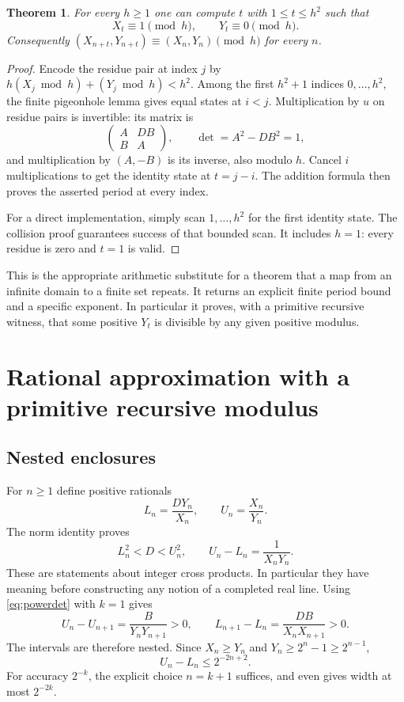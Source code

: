 \documentclass[11pt,letterpaper]{article}
\newtheorem{theorem}{Theorem}[section]
\theoremstyle{definition}
\begin{document}
\begin{theorem}\label{thm:modular}
For every $h\ge1$ one can compute $t$ with $1\le t\le h^2$ such that
\[
 X_t\equiv1\pmod h,\qquad Y_t\equiv0\pmod h.
\]
Consequently $(X_{n+t},Y_{n+t})\equiv(X_n,Y_n)\pmod h$ for every $n$.
\end{theorem}
\begin{proof}
Encode the residue pair at index $j$ by
$h(X_j\bmod h)+(Y_j\bmod h)<h^2$.
Among the first $h^2+1$ indices $0,\ldots,h^2$, the finite pigeonhole
lemma gives equal states at $i<j$. Multiplication by $u$ on residue pairs
is invertible: its matrix is
\[
 \begin{pmatrix}A&DB\\B&A\end{pmatrix},\qquad
 \det=A^2-DB^2=1,
\]
and multiplication by $(A,-B)$ is its inverse, also modulo $h$.
Cancel $i$ multiplications to get the identity state at $t=j-i$.
The addition formula then proves the asserted period at every index.

For a direct implementation, simply scan $1,\ldots,h^2$ for the first
identity state. The collision proof guarantees success of that bounded
scan. It includes $h=1$: every residue is zero and $t=1$ is valid.
\end{proof}

This is the appropriate arithmetic substitute for a theorem that a map from
an infinite domain to a finite set repeats. It returns an explicit finite
period bound and a specific exponent. In particular it proves, with a
primitive recursive witness, that some positive $Y_t$ is divisible by any
given positive modulus.

\section{Rational approximation with a primitive recursive modulus}\label{sec:approximation}

\subsection{Nested enclosures}

For $n\ge1$ define positive rationals
\[
 L_n=\frac{DY_n}{X_n},\qquad U_n=\frac{X_n}{Y_n}.
\]
The norm identity proves
\begin{equation}\label{eq:enclosure}
 L_n^2<D<U_n^2,\qquad U_n-L_n=\frac1{X_nY_n}.
\end{equation}
These are statements about integer cross products. In particular they have
meaning before constructing any notion of a completed real line.
Using \eqref{eq:powerdet} with $k=1$ gives
\begin{equation}\label{eq:nesting}
 U_n-U_{n+1}=\frac B{Y_nY_{n+1}}>0,\qquad
 L_{n+1}-L_n=\frac{DB}{X_nX_{n+1}}>0.
\end{equation}
The intervals are therefore nested. Since $X_n\ge Y_n$ and
$Y_n\ge2^n-1\ge2^{n-1}$,
\begin{equation}\label{eq:modulus}
 U_n-L_n\le2^{-2n+2}.
\end{equation}
For accuracy $2^{-k}$, the explicit choice $n=k+1$ suffices, and even
gives width at most $2^{-2k}$.
\end{document}
